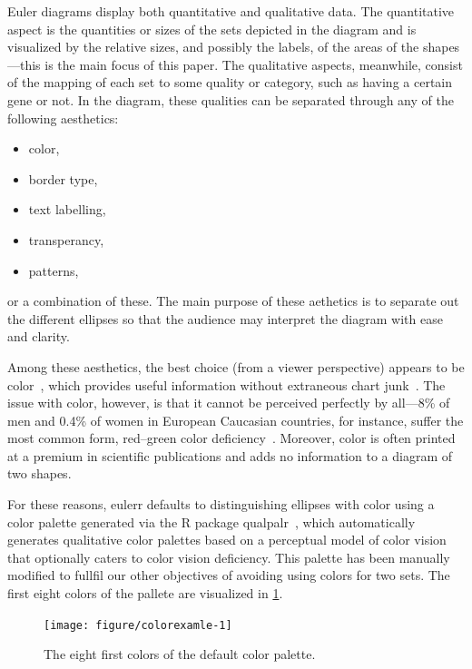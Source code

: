 \documentclass[
  oneside,
  openany,
  numbers=noendperiod,
  parskip=half,
  bibliography=totoc
]{scrbook}\usepackage[]{graphicx}\usepackage{xcolor}
\newenvironment{knitrout}{}{} %
\newcommand{\pkg}[1]{{\fontseries{b}\selectfont #1}}
\begin{document}
Euler diagrams display both quantitative and qualitative data. The quantitative
aspect is the quantities or sizes of the sets depicted in the diagram and is
visualized by the relative sizes, and possibly the labels, of the areas of the
shapes---this is the main focus of this paper. The qualitative aspects,
meanwhile, consist of the mapping of each set to some quality or category, such
as having a certain gene or not. In the diagram, these qualities can be
separated through any of the following aesthetics:
%
\begin{itemize}
\item color,
\item border type,
\item text labelling,
\item transperancy,
\item patterns,
\end{itemize}
%
or a combination of these. The main purpose of these aethetics is to separate
out the different ellipses so that the audience may interpret the diagram with
ease and clarity.

Among these aesthetics, the best choice (from a viewer perspective) appears to
be color~\citep{Blake_2016}, which provides useful information without
extraneous chart junk~\citep{Tufte_2001}. The issue with color, however, is that
it cannot be perceived perfectly by all---8\% of men and 0.4\% of women in
European Caucasian countries, for instance, suffer the most common form,
red--green color deficiency~\cite{Birch_2012}. Moreover, color
is often printed at a premium in scientific publications and adds no information
to a diagram of two shapes.

For these reasons, \pkg{eulerr} defaults to distinguishing ellipses with color
using a color palette generated via the R package
\pkg{qualpalr}~\citep{Larsson_2016}, which automatically generates qualitative
color palettes based on a perceptual model of color vision that optionally
caters to color vision deficiency. This palette has been manually modified
to fullfil our other objectives of avoiding using colors for two
sets. The first eight colors of the pallete are visualized in
\cref{fig:colorexample}.

\begin{figure}[htbp]
\caption{The eight first colors of the default color palette.\label{fig:colorexample}}
\begin{knitrout}\small
{}\color{fgcolor}

{\centering \texttt{[image: figure/colorexamle-1]}

}



\end{knitrout}
\end{figure}
\end{document}
